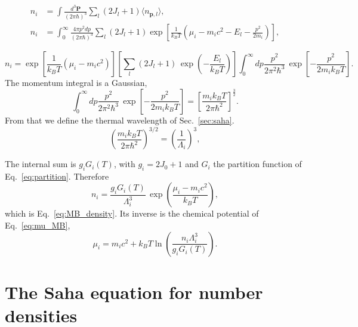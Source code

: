 \begin{align}
    n_i&=\int \frac{d^3\mathbf P}{(2\pi\hbar)^3}\sum_{l}(2J_l+1)\langle n_{\mathbf p,l}\rangle,\\
    n_i&=\int_0^\infty \frac{4\pi p^2dp}{(2\pi\hbar)^3}\sum_{l}(2J_l+1)\exp\left[\frac{1}{k_BT}(\mu_i-m_ic^2-E_l-\frac{p^2}{2m_i})\right],
\end{align}

\begin{equation}\label{eq:apB_n_sum}
  n_i=\exp\left[\frac{1}{k_BT}(\mu_i-m_ic^2)\right]\left[\sum_l(2J_l+1)\,\exp\left(-\frac{E_l}{k_BT}\right)\right]\int_0^\infty dp\frac{ p^2}{2\pi^2\hbar^3}\,\exp\left[-\frac{p^2}{2m_ik_BT}\right].
\end{equation}
The momentum integral is a Gaussian,
\begin{equation}
    \int_0^\infty dp\frac{ p^2}{2\pi^2\hbar^3}\,\exp\left[-\frac{p^2}{2m_ik_BT}\right]=\left[\frac{m_ik_BT}{2\pi \hbar^2}\right]^{\frac{3}{2}}.
\end{equation}
From that we define the thermal wavelength of Sec.~\ref{sec:saha}.
\begin{equation}\label{eq:apB_gauss}
  \left(\frac{m_ik_BT}{2\pi\hbar^2}\right)^{3/2}=\left(\frac{1}{\Lambda_i}\right)^{3},
\end{equation}

\noindent The internal sum is $g_iG_i(T)$, with $g_i=2J_0+1$ and $G_i$ the partition function of Eq.~\ref{eq:partition}.
Therefore
\begin{equation}\label{eq:apB_MB}
  n_i=\frac{g_iG_i(T)}{\Lambda_i^3}\,\exp\left(\frac{\mu_i-m_ic^2}{k_BT}\right),
\end{equation}
which is Eq.~\ref{eq:MB_density}.
Its inverse is the chemical potential of Eq.~\ref{eq:mu_MB},
\begin{equation}\label{eq:apB_mu}
  \mu_i=m_ic^2+k_BT\ln\left(\frac{n_i\Lambda_i^3}{g_iG_i(T)}\right) .
\end{equation}

\section{The Saha equation for number densities}\label{sec:apB_saha_n}

